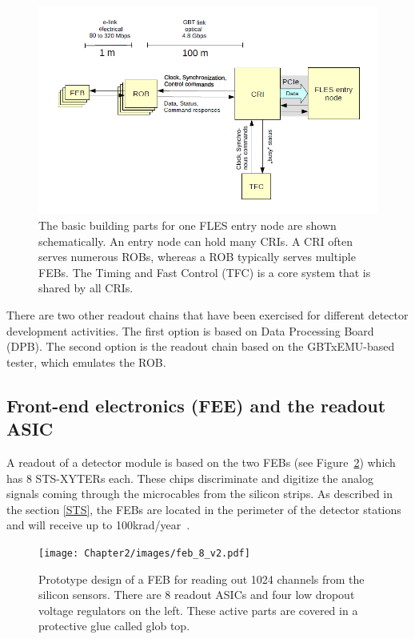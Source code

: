 \begin{figure}[!h]
\centering
\includegraphics[width=0.8\columnwidth]{Chapter2/images/CRI_DAQ.png}
\caption{The basic building parts for one \gls{FLES} entry node are shown schematically. An entry node can hold many \glspl{CRI}. A \gls{CRI} often serves numerous \glspl{ROB}, whereas a \gls{ROB} typically serves multiple \glspl{FEB}. The Timing and Fast Control (\gls{TFC}) is a core system that is shared by all \glspl{CRI}.}
\label{fig_daq_cri}
\end{figure}

There are two other readout chains that have been exercised for different detector development activities. The first option is based on Data Processing Board (\gls{DPB}).
The second option is the readout chain based on the  GBTxEMU-based tester, which emulates the \gls{ROB}.


\subsection{Front-end electronics (FEE) and the readout ASIC}

A readout of a detector module is based on the two \glspl{FEB} (see Figure~\ref{fig_feb}) which has 8 STS-XYTERs each. These chips discriminate and digitize the analog signals coming through the microcables from the silicon strips. As described in the section \ref{STS}, the \glspl{FEB} are located in the perimeter of the detector stations and will receive up to 100krad/year~\cite{Heuser:54798}.

\begin{figure}[!h]
\centering
\texttt{[image: Chapter2/images/feb\_8\_v2.pdf]}
\caption{Prototype design of a \gls{FEB} for reading out 1024 channels from the silicon sensors. There are 8 readout ASICs and four low dropout voltage regulators on the left. These active parts are covered in a protective glue called glob top.}
\label{fig_feb}
\end{figure}

